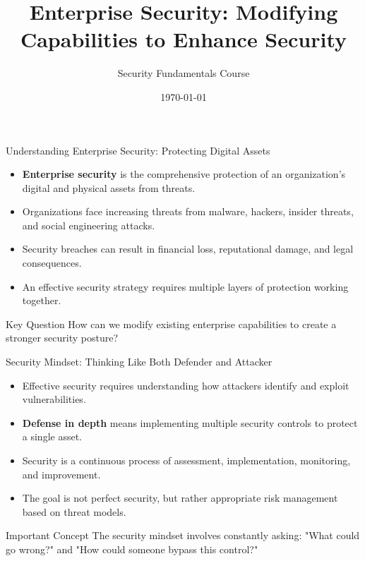 \documentclass{beamer}
\title{Enterprise Security: Modifying Capabilities to Enhance Security}
\author{Security Fundamentals Course}
\date{\today}
\begin{document}
\begin{frame}
\titlepage
\end{frame}

\begin{frame}{Understanding Enterprise Security: Protecting Digital Assets}
\begin{itemize}
\item \textbf{Enterprise security} is the comprehensive protection of an organization's digital and physical assets from threats.
\item Organizations face increasing threats from malware, hackers, insider threats, and social engineering attacks.
\item Security breaches can result in financial loss, reputational damage, and legal consequences.
\item An effective security strategy requires multiple layers of protection working together.
\end{itemize}

\begin{block}{Key Question}
How can we modify existing enterprise capabilities to create a stronger security posture?
\end{block}
\end{frame}

\begin{frame}{Security Mindset: Thinking Like Both Defender and Attacker}
\begin{itemize}
\item Effective security requires understanding how attackers identify and exploit vulnerabilities.
\item \textbf{Defense in depth} means implementing multiple security controls to protect a single asset.
\item Security is a continuous process of assessment, implementation, monitoring, and improvement.
\item The goal is not perfect security, but rather appropriate risk management based on threat models.
\end{itemize}

\begin{alertblock}{Important Concept}
The security mindset involves constantly asking: "What could go wrong?" and "How could someone bypass this control?"
\end{alertblock}
\end{frame}
\end{document}
